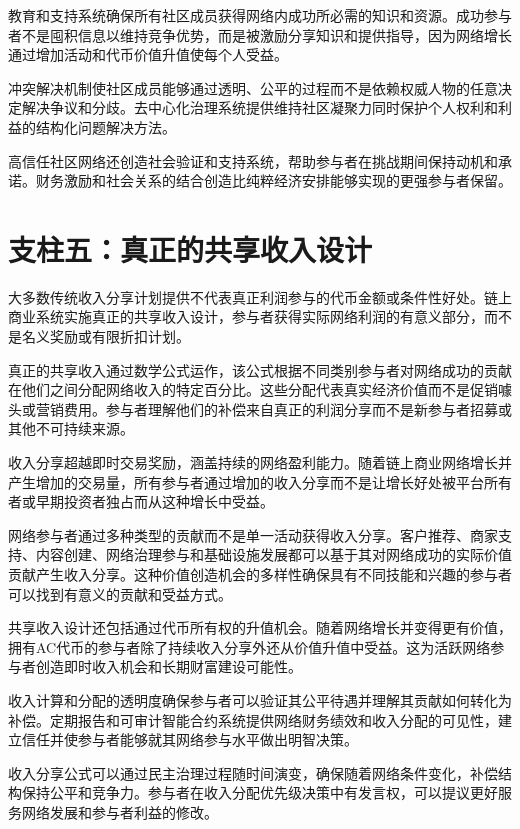 \documentclass[
  Letterpaper,
]{scrbook}
\begin{document}
教育和支持系统确保所有社区成员获得网络内成功所必需的知识和资源。成功参与者不是囤积信息以维持竞争优势，而是被激励分享知识和提供指导，因为网络增长通过增加活动和代币价值升值使每个人受益。

冲突解决机制使社区成员能够通过透明、公平的过程而不是依赖权威人物的任意决定解决争议和分歧。去中心化治理系统提供维持社区凝聚力同时保护个人权利和利益的结构化问题解决方法。

高信任社区网络还创造社会验证和支持系统，帮助参与者在挑战期间保持动机和承诺。财务激励和社会关系的结合创造比纯粹经济安排能够实现的更强参与者保留。

\section{支柱五：真正的共享收入设计}\label{ux652fux67f1ux4e94ux771fux6b63ux7684ux5171ux4eabux6536ux5165ux8bbeux8ba1}

大多数传统收入分享计划提供不代表真正利润参与的代币金额或条件性好处。链上商业系统实施真正的共享收入设计，参与者获得实际网络利润的有意义部分，而不是名义奖励或有限折扣计划。

真正的共享收入通过数学公式运作，该公式根据不同类别参与者对网络成功的贡献在他们之间分配网络收入的特定百分比。这些分配代表真实经济价值而不是促销噱头或营销费用。参与者理解他们的补偿来自真正的利润分享而不是新参与者招募或其他不可持续来源。

收入分享超越即时交易奖励，涵盖持续的网络盈利能力。随着链上商业网络增长并产生增加的交易量，所有参与者通过增加的收入分享而不是让增长好处被平台所有者或早期投资者独占而从这种增长中受益。

网络参与者通过多种类型的贡献而不是单一活动获得收入分享。客户推荐、商家支持、内容创建、网络治理参与和基础设施发展都可以基于其对网络成功的实际价值贡献产生收入分享。这种价值创造机会的多样性确保具有不同技能和兴趣的参与者可以找到有意义的贡献和受益方式。

共享收入设计还包括通过代币所有权的升值机会。随着网络增长并变得更有价值，拥有AC代币的参与者除了持续收入分享外还从价值升值中受益。这为活跃网络参与者创造即时收入机会和长期财富建设可能性。

收入计算和分配的透明度确保参与者可以验证其公平待遇并理解其贡献如何转化为补偿。定期报告和可审计智能合约系统提供网络财务绩效和收入分配的可见性，建立信任并使参与者能够就其网络参与水平做出明智决策。

收入分享公式可以通过民主治理过程随时间演变，确保随着网络条件变化，补偿结构保持公平和竞争力。参与者在收入分配优先级决策中有发言权，可以提议更好服务网络发展和参与者利益的修改。
\end{document}
